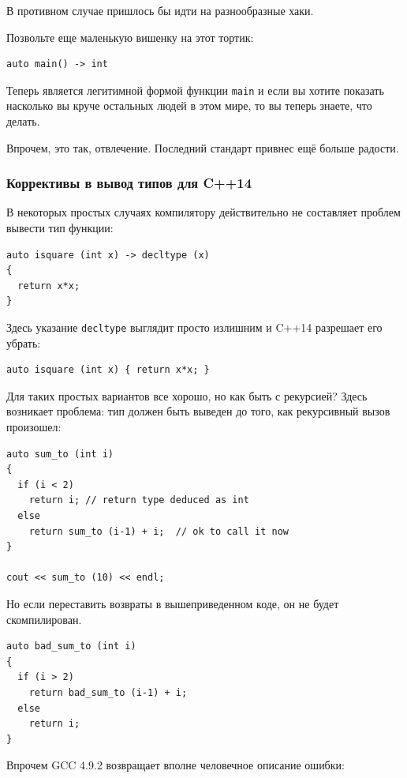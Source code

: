 \documentclass[a4paper,12pt,oneside]{article}
\begin{document}
В противном случае пришлось бы идти на разнообразные хаки.

Позвольте еще маленькую вишенку на этот тортик:

\begin{lstlisting}
auto main() -> int
\end{lstlisting}

Теперь является легитимной формой функции \lstinline!main! и если вы хотите показать насколько вы круче остальных людей в этом мире, то вы теперь знаете, что делать.

Впрочем, это так, отвлечение. Последний стандарт привнес ещё больше радости.

\subsubsection{Коррективы в вывод типов для C++14}\label{DecltypeAuto14}

В некоторых простых случаях компилятору действительно не составляет проблем вывести тип функции: 

\begin{lstlisting}
auto isquare (int x) -> decltype (x) 
{ 
  return x*x;
}
\end{lstlisting}

Здесь указание \lstinline!decltype! выглядит просто излишним и C++14 разрешает его убрать:

\begin{lstlisting}
auto isquare (int x) { return x*x; }
\end{lstlisting}

Для таких простых вариантов все хорошо, но как быть с рекурсией? Здесь возникает проблема: тип должен быть выведен до того, как рекурсивный вызов произошел:

\begin{lstlisting}
auto sum_to (int i)
{
  if (i < 2)
    return i; // return type deduced as int
  else
    return sum_to (i-1) + i;  // ok to call it now
}

cout << sum_to (10) << endl;
\end{lstlisting}

Но если переставить возвраты в вышеприведенном коде, он не будет скомпилирован.

\begin{lstlisting}
auto bad_sum_to (int i)
{
  if (i > 2)
    return bad_sum_to (i-1) + i;
  else
    return i;
}
\end{lstlisting}

Впрочем GCC 4.9.2 возвращает вполне человечное описание ошибки:
\end{document}
